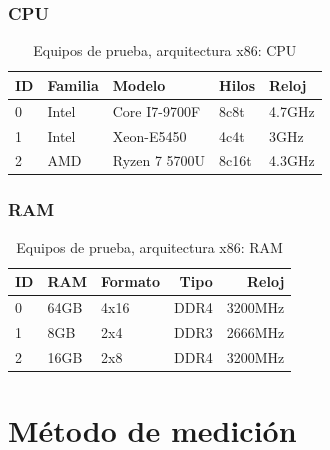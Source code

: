\subsubsection{CPU}

\begin{center}
    \begin{table}[h]
        \centering
        \begin{tabular}{ l | l l l l }
            \hline
            ID & Familia & Modelo & Hilos & Reloj \\
            \hline
            0 & Intel & Core I7-9700F & 8c8t & 4.7GHz \\
            1 & Intel & Xeon-E5450 & 4c4t & 3GHz \\
            2 & AMD & Ryzen 7 5700U & 8c16t & 4.3GHz \\
            \hline
        \end{tabular}
        \caption{Equipos de prueba, arquitectura x86: CPU}
    \end{table}
\end{center}

\subsubsection{RAM}

\begin{center}
    \begin{table}[h]
        \centering
        \begin{tabular}{ l | l l r r}
            \hline
            ID & RAM & Formato & Tipo & Reloj \\
            \hline
            0 & 64GB & 4x16 & DDR4 & 3200MHz \\
            1 & 8GB & 2x4 & DDR3 & 2666MHz \\
            2 & 16GB & 2x8 & DDR4 & 3200MHz \\
            \hline
        \end{tabular}
        \caption{Equipos de prueba, arquitectura x86: RAM}
    \end{table}
\end{center}

\pagebreak

\section{Método de medición}

